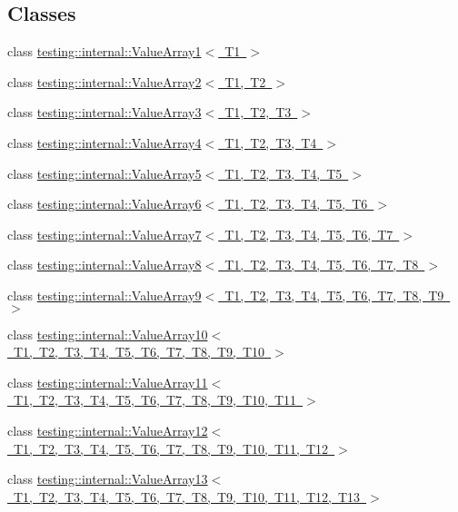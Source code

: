 \subsection*{Classes}
\begin{DoxyCompactItemize}
\item 
class \mbox{\hyperlink{classtesting_1_1internal_1_1_value_array1}{testing\+::internal\+::\+Value\+Array1$<$ T1 $>$}}
\item 
class \mbox{\hyperlink{classtesting_1_1internal_1_1_value_array2}{testing\+::internal\+::\+Value\+Array2$<$ T1, T2 $>$}}
\item 
class \mbox{\hyperlink{classtesting_1_1internal_1_1_value_array3}{testing\+::internal\+::\+Value\+Array3$<$ T1, T2, T3 $>$}}
\item 
class \mbox{\hyperlink{classtesting_1_1internal_1_1_value_array4}{testing\+::internal\+::\+Value\+Array4$<$ T1, T2, T3, T4 $>$}}
\item 
class \mbox{\hyperlink{classtesting_1_1internal_1_1_value_array5}{testing\+::internal\+::\+Value\+Array5$<$ T1, T2, T3, T4, T5 $>$}}
\item 
class \mbox{\hyperlink{classtesting_1_1internal_1_1_value_array6}{testing\+::internal\+::\+Value\+Array6$<$ T1, T2, T3, T4, T5, T6 $>$}}
\item 
class \mbox{\hyperlink{classtesting_1_1internal_1_1_value_array7}{testing\+::internal\+::\+Value\+Array7$<$ T1, T2, T3, T4, T5, T6, T7 $>$}}
\item 
class \mbox{\hyperlink{classtesting_1_1internal_1_1_value_array8}{testing\+::internal\+::\+Value\+Array8$<$ T1, T2, T3, T4, T5, T6, T7, T8 $>$}}
\item 
class \mbox{\hyperlink{classtesting_1_1internal_1_1_value_array9}{testing\+::internal\+::\+Value\+Array9$<$ T1, T2, T3, T4, T5, T6, T7, T8, T9 $>$}}
\item 
class \mbox{\hyperlink{classtesting_1_1internal_1_1_value_array10}{testing\+::internal\+::\+Value\+Array10$<$ T1, T2, T3, T4, T5, T6, T7, T8, T9, T10 $>$}}
\item 
class \mbox{\hyperlink{classtesting_1_1internal_1_1_value_array11}{testing\+::internal\+::\+Value\+Array11$<$ T1, T2, T3, T4, T5, T6, T7, T8, T9, T10, T11 $>$}}
\item 
class \mbox{\hyperlink{classtesting_1_1internal_1_1_value_array12}{testing\+::internal\+::\+Value\+Array12$<$ T1, T2, T3, T4, T5, T6, T7, T8, T9, T10, T11, T12 $>$}}
\item 
class \mbox{\hyperlink{classtesting_1_1internal_1_1_value_array13}{testing\+::internal\+::\+Value\+Array13$<$ T1, T2, T3, T4, T5, T6, T7, T8, T9, T10, T11, T12, T13 $>$}}

\end{DoxyCompactItemize}
